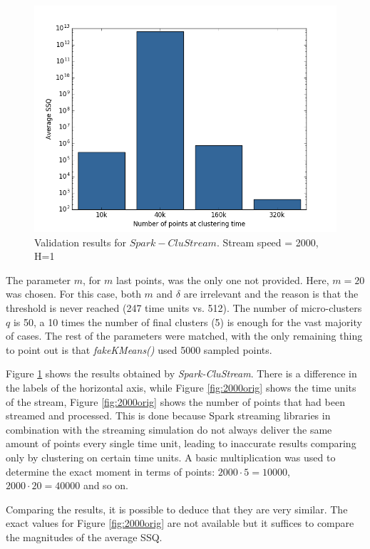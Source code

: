 \documentclass{llncs}
\begin{document}
\begin{figure}[h!]
 \centering
 \includegraphics[scale=0.5]{./styles/2000h1.png}
 \caption{Validation results for $Spark-CluStream$. Stream speed = 2000, H=1}
 \label{fig:2000}
\end{figure}

The parameter $m$, for $m$ last points, was the only one not provided. Here, $m=20$ was chosen. For this case, both $m$ and $\delta$ are irrelevant and the reason is that the threshold is never reached (247 time units vs. 512). The number of micro-clusters $q$ is 50, a 10 times the number of final clusters (5) is enough for the vast majority of cases\cite{clustreamOrig}. The rest of the parameters were matched, with the only remaining thing to point out is that \textit{fakeKMeans()} used 5000 sampled points.

Figure \ref{fig:2000} shows the results obtained by \textit{Spark-CluStream}. There is a difference in the labels of the horizontal axis, while Figure \ref{fig:2000orig} shows the time units of the stream, Figure \ref{fig:2000orig} shows the number of points that had been streamed and processed. This is done because Spark streaming libraries in combination with the streaming simulation do not always deliver the same amount of points every single time unit, leading to inaccurate results comparing only by clustering on certain time units. A basic multiplication was used to determine the exact moment in terms of points: $2000\cdot 5 = 10000$, $2000\cdot 20 = 40000$ and so on.

Comparing the results, it is possible to deduce that they are very similar. The exact values for Figure \ref{fig:2000orig} are not available but it suffices to compare the magnitudes of the average SSQ. 
\end{document}

